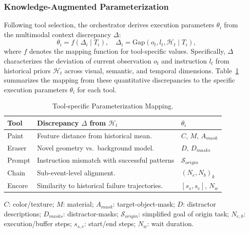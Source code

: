 \subsubsection{Knowledge-Augmented Parameterization}%
\label{Knowledge-Augmented Parameterization}
Following tool selection, the {\color{black}orchestrator} derives execution parameters $\theta_i$ from the {\color{black}multimodal} context discrepancy $\Delta$:
\begin{equation}
 \theta_i = f(\Delta_i \mid T_i), \quad \Delta_i = \text{Gap}(o_t, l_t, \mathcal{H}_t\mid T_i),
\end{equation}
where $f$ denotes the mapping function for tool-specific values. Specifically, $\Delta$ characterizes the deviation of current observation $o_t$ and instruction $l_t$ from historical priors $\mathcal{H}_t$ across visual, semantic, and temporal dimensions. Table~\ref{tab:parameterization_formal} summarizes the mapping from these quantitative discrepancies to the specific execution parameters $\theta_i$ for each tool.
\begin{table}[htbp]
\vspace{-1.5em}
\centering
\caption{Tool-specific Parameterization Mapping.}%
\label{tab:parameterization_formal}
\footnotesize
\renewcommand{\arraystretch}{1.25}
\begin{tabularx}{\columnwidth}{@{} l X l @{}}
\toprule
\textbf{Tool} & \textbf{Discrepancy $\Delta$ from $\mathcal{H}_t$} & \textbf{$\theta_i$} \\
\midrule
Paint  & Feature distance from historical mean.         & $C,\,M,\,A_{mask}$ \\
Eraser & Novel geometry vs.\ background model.          & $D,\,D_{masks}$ \\
Prompt & Instruction mismatch with successful patterns  & $\mathcal{S}_{origin}$ \\
Chain  & Sub-event-level alignment.                     & $(N_{e},N_{b})_k$ \\
Encore & Similarity to historical failure trajectories. & $[s_s,s_e],\,N_w$ \\
\bottomrule
\end{tabularx}
\vspace{3pt}
\begin{flushleft}
\scriptsize
\textbf{$C$}: color/texture;\enspace
\textbf{$M$}: material;\enspace
\textbf{$A_{mask}$}: target-object-mask;\enspace
\textbf{$D$}: distractor descriptions;\enspace
\textbf{$D_{masks}$}: distractor-masks;\enspace
\textbf{$\mathcal{S}_{origin}$}: simplified goal of origin task;\enspace
\textbf{$N_{e,b}$}: execution/buffer steps;\enspace
\textbf{$s_{s,e}$}: start/end steps;\enspace
\textbf{$N_w$}: wait duration.
\end{flushleft}
\vspace{-0.5em}
\end{table}


